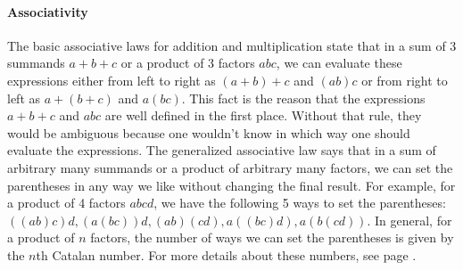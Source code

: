 \paragraph{Associativity}
The basic associative laws for addition and multiplication state that in a sum of 3 summands $a + b + c$ or a product of 3 factors $a b c$, we can evaluate these expressions either from left to right as $(a+b)+c$ and $(ab)c$ or from right to left as $a+(b+c)$ and $a(bc)$. This fact is the reason that the expressions $a+b+c$ and $abc$ are well defined in the first place. Without that rule, they would be ambiguous because one wouldn't know in which way one should evaluate the expressions. The generalized associative law says that in a sum of arbitrary many summands or a product of arbitrary many factors, we can set the parentheses in any way we like without changing the final result. For example, for a product of 4 factors $abcd$, we have the following 5 ways to set the parentheses: $((ab)c)d, (a(bc))d, (ab)(cd), a((bc)d), a(b(cd))$. In general, for a product of $n$ factors, the number of ways we can set the parentheses is given by the $n$th Catalan number. For more details about these numbers, see page \pageref{Sec:CatalanNumbers}.

